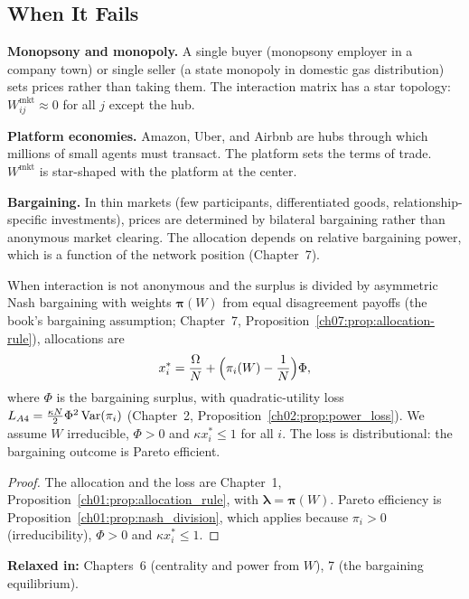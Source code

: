 \documentclass[../structural_economics_book.tex]{subfiles}
\begin{document}
\subsection{When It Fails}

\textbf{Monopsony and monopoly.} A single buyer (monopsony employer in a company town) or single seller (a state monopoly in domestic gas distribution) sets prices rather than taking them. The interaction matrix has a star topology: $W_{ij}^{\text{mkt}} \approx 0$ for all $j$ except the hub.

\textbf{Platform economies.} Amazon, Uber, and Airbnb are hubs through which millions of small agents must transact. The platform sets the terms of trade. $W^{\text{mkt}}$ is star-shaped with the platform at the center.

\textbf{Bargaining.} In thin markets (few participants, differentiated goods, relationship-specific investments), prices are determined by bilateral bargaining rather than anonymous market clearing. The allocation depends on relative bargaining power, which is a function of the network position (Chapter~7).

\begin{proposition}\label{ch04:prop:A4_loss}
When interaction is not anonymous and the surplus is divided by asymmetric Nash bargaining with weights $\boldsymbol{\pi}(W)$ from equal disagreement payoffs (the book's bargaining assumption; Chapter~7, Proposition~\ref{ch07:prop:allocation-rule}), allocations are
\begin{equation}
x_i^* = \frac{\Omega}{N} + \Bigl(\pi_i(W) - \frac{1}{N}\Bigr)\Phi,
\end{equation}
where $\Phi$ is the bargaining surplus, with quadratic-utility loss $L_{A4} = \frac{\kappa N}{2}\Phi^2\operatorname{Var}(\pi_i)$ (Chapter~2, Proposition~\ref{ch02:prop:power_loss}). We assume $W$ irreducible, $\Phi > 0$ and $\kappa x_i^* \le 1$ for all $i$. The loss is distributional: the bargaining outcome is Pareto efficient.
\end{proposition}

\begin{proof}
The allocation and the loss are Chapter~1, Proposition~\ref{ch01:prop:allocation_rule}, with $\boldsymbol{\lambda} = \boldsymbol{\pi}(W)$. Pareto efficiency is Proposition~\ref{ch01:prop:nash_division}, which applies because $\pi_i > 0$ (irreducibility), $\Phi > 0$ and $\kappa x_i^* \le 1$.
\end{proof}

\textbf{Relaxed in:} Chapters~6 (centrality and power from $W$), 7 (the bargaining equilibrium).
\end{document}
